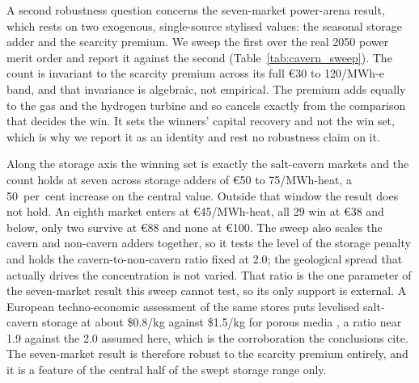 A second robustness question concerns the seven-market power-arena result, which rests
on two exogenous, single-source stylised values: the seasonal storage adder and the
scarcity premium. We sweep the first over the real 2050 power merit order and report it
against the second (Table~\ref{tab:cavern_sweep}). The count is invariant to the
scarcity premium across its full \euro{}30 to 120/MWh-e band, and that invariance is
algebraic, not empirical. The premium adds equally to the gas and the hydrogen turbine
and so cancels exactly from the comparison that decides the win. It sets the winners'
capital recovery and not the win set, which is why we report it as an identity and rest
no robustness claim on it.

Along the storage axis the winning set is exactly the salt-cavern markets and the count
holds at seven across storage adders of \euro{}50 to 75/MWh-heat, a 50~per~cent increase
on the central value. Outside that window the result does not hold. An eighth market
enters at \euro{}45/MWh-heat, all 29 win at \euro{}38 and below, only two survive at
\euro{}88 and none at \euro{}100. The sweep also scales the cavern and non-cavern adders
together, so it tests the level of the storage penalty and holds the
cavern-to-non-cavern ratio fixed at 2.0; the geological spread that actually drives the
concentration is not varied. That ratio is the one parameter of the seven-market result
this sweep cannot test, so its only support is external. A European techno-economic
assessment of the same stores puts levelised salt-cavern storage at about \$0.8/kg
against \$1.5/kg for porous media \citep{Talukdar2024UHSEurope}, a ratio near 1.9 against
the 2.0 assumed here, which is the corroboration the conclusions cite. The seven-market
result is therefore robust to the scarcity premium entirely, and it is a feature of the
central half of the swept storage range only.

